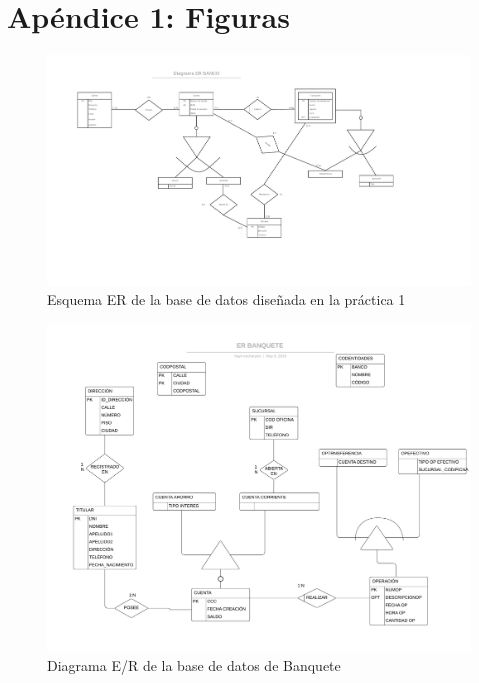 \documentclass{article}
\begin{document}
\section{Apéndice 1: Figuras}

\begin{landscape}
\begin{figure}
\centering
\includegraphics[scale=0.75]{images/er_practica1.png}
\caption{Esquema ER de la base de datos diseñada en la práctica 1}
\label{fig:er1}
\end{figure}
\end{landscape}




\newpage
\begin{landscape}
\begin{figure}
\centering
\includegraphics[scale=0.75]{images/ER_BANQUETE.jpeg}
\caption{Diagrama E/R de la base de datos de Banquete}
\label{fig:er_banquete}
\end{figure}
\end{landscape}
\pagebreak
\end{document}
